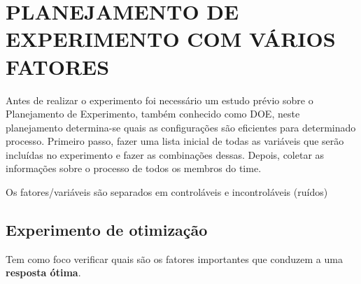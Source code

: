 \chapter{PLANEJAMENTO DE EXPERIMENTO COM VÁRIOS FATORES}
\label{chap:estudo}

Antes de realizar o experimento foi necessário um estudo prévio sobre o Planejamento de Experimento, também conhecido como \ac{DOE}, neste planejamento determina-se quais as configurações são eficientes para determinado processo.
Primeiro passo, fazer uma lista inicial de todas as variáveis que serão incluídas no experimento e fazer as combinações dessas. Depois, coletar as informações sobre o processo de todos os membros do time. 

Os fatores/variáveis são separados em controláveis e incontroláveis (ruídos)

\section{Experimento de otimização}
Tem como foco verificar quais são os fatores importantes que conduzem a uma \textbf{resposta ótima}. 
